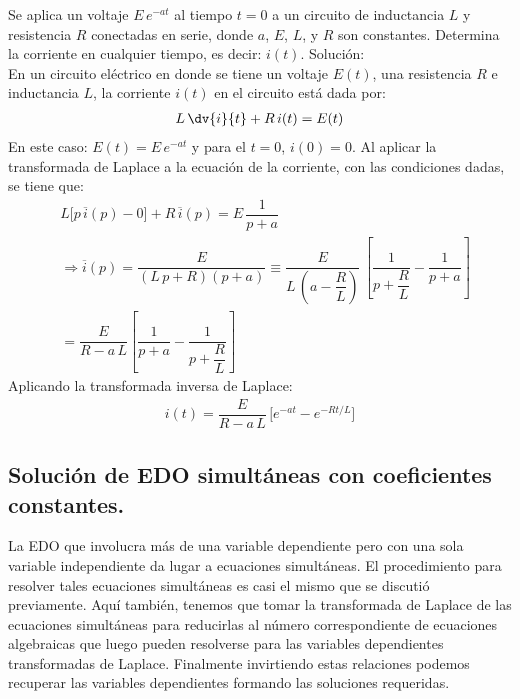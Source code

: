 \begin{ejemplo}
Se aplica un voltaje $E \, e^{- a t}$ al tiempo $t = 0$ a un circuito de inductancia $L$ y resistencia $R$ conectadas en serie, donde $a$, $E$, $L$, y $R$ son constantes. Determina la corriente en cualquier tiempo, es decir: $i(t)$.
\noindent Solución:
\\[0.5em]
En un circuito eléctrico en donde se tiene un voltaje $E(t)$, una resistencia $R$ e inductancia $L$, la corriente $i(t)$ en el circuito está dada por:
\begin{align*}
L \, \dv{i}{t} + R \, i(t) =  E(t)
\end{align*}
En este caso: $E(t) = E \, e^{-a t}$ y para el $t = 0$, $i(0) = 0$. Al aplicar la transformada de Laplace a la ecuación de la corriente, con las condiciones dadas, se tiene que:
\begin{align*}
&L \big[ p \, \overline{i}(p) - 0 \big] + R \, \overline{i} (p) = E \, \dfrac{1}{p + a} \\[0.5em]
&\Rightarrow \overline{i}(p) = \dfrac{E}{(L \, p + R)(p + a)} \equiv \dfrac{E}{L \, \left(a - \dfrac{R}{L} \right)} \, \left[ \dfrac{1}{p + \dfrac{R}{L}}  - \dfrac{1}{p + a}\right] \\[0.5em]
&= \dfrac{E}{R - a \, L} \left[ \dfrac{1}{p + a} - \dfrac{1}{p + \dfrac{R}{L}}\right]
\end{align*}
Aplicando la transformada inversa de Laplace:
\begin{align*}
i(t) = \dfrac{E}{R - a \, L} \, \big[ e^{-a t} - e^{-R t /L}\big]
\end{align*}
\end{ejemplo}

\subsection{Solución de EDO simultáneas con coeficientes constantes.}

La EDO que involucra más de una variable dependiente pero con una sola variable independiente da lugar a ecuaciones simultáneas. El procedimiento para resolver tales ecuaciones simultáneas es casi el mismo que se discutió previamente. Aquí también, tenemos que tomar la transformada de Laplace de las ecuaciones simultáneas para reducirlas al número correspondiente de ecuaciones algebraicas que luego pueden resolverse para las variables dependientes transformadas de Laplace. Finalmente invirtiendo estas relaciones podemos recuperar las variables dependientes formando las soluciones requeridas.
